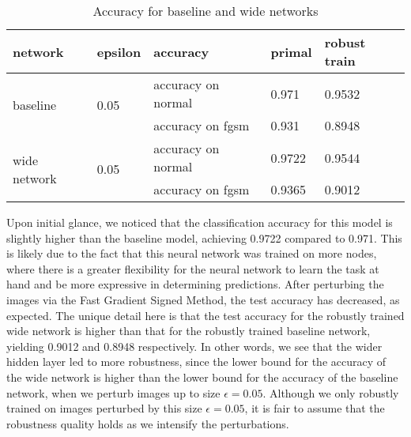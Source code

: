 \documentclass{article}
\begin{document}
\begin{table}[H]
\centering
\begin{tabular}{|l|l|l|l|l|}
\hline
network                       & epsilon               & accuracy           & primal & robust train \\ \hline
\multirow{2}{*}{baseline}     & \multirow{2}{*}{0.05} & accuracy on normal & 0.971  & 0.9532       \\ \cline{3-5} 
                              &                       & accuracy on fgsm   & 0.931  & 0.8948       \\ \hline
\multirow{2}{*}{wide network} & \multirow{2}{*}{0.05} & accuracy on normal & 0.9722 & 0.9544       \\ \cline{3-5} 
                              &                       & accuracy on fgsm   & 0.9365 & 0.9012       \\ \hline
\end{tabular}
\caption{Accuracy for baseline and wide networks}
\end{table}

Upon initial glance, we noticed that the classification accuracy for this model is slightly 
higher than the baseline model, achieving 0.9722 compared to 0.971. This is likely due to the fact 
that this neural network was trained on more nodes, where there is a greater flexibility for the 
neural network to learn the task at hand and be more expressive in determining predictions. After 
perturbing the images via the Fast Gradient Signed Method, the test accuracy has decreased, as 
expected. The unique detail here is that the test accuracy for the robustly trained wide network is
higher than that for the robustly trained baseline network, yielding 0.9012 and 0.8948 respectively. 
In other words, we see that the wider hidden layer led to more robustness, since the lower bound for 
the accuracy of the wide network is higher than the lower bound for the accuracy of the baseline 
network, when we perturb images up to size $\epsilon = 0.05$. Although we only robustly trained on 
images perturbed by this size $\epsilon = 0.05$, it is fair to assume that the robustness quality 
holds as we intensify the perturbations.
\end{document}

